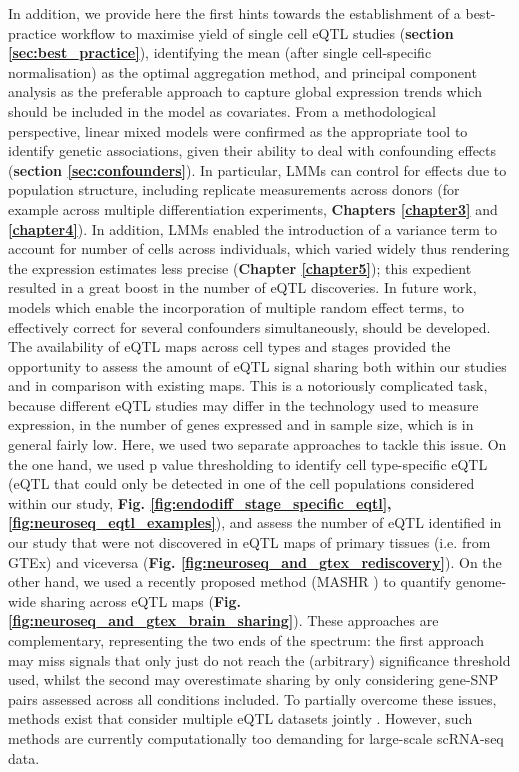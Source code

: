 In addition, we provide here the first hints towards the establishment of a best-practice workflow to maximise yield of single cell eQTL studies (\textbf{section \ref{sec:best_practice}}), identifying the mean (after single cell-specific normalisation) as the optimal aggregation method, and principal component analysis as the preferable approach to capture global expression trends which should be included in the model as covariates. 
From a methodological perspective, linear mixed models were confirmed as the appropriate tool to identify genetic associations, given their ability to deal with confounding effects (\textbf{section \ref{sec:confounders}}).
In particular, LMMs can control for effects due to population structure, including replicate measurements across donors (for example across multiple differentiation experiments, \textbf{Chapters \ref{chapter3}} and \textbf{\ref{chapter4}}).
In addition, LMMs enabled the introduction of a variance term to account for number of cells across individuals, which varied widely thus rendering the expression estimates less precise (\textbf{Chapter \ref{chapter5}}); this expedient resulted in a great boost in the number of eQTL discoveries. 
In future work, models which enable the incorporation of multiple random effect terms, to effectively correct for several confounders simultaneously, should be developed. 
\\

The availability of eQTL maps across cell types and stages provided the opportunity to assess the amount of eQTL signal sharing both within our studies and in comparison with existing maps.
This is a notoriously complicated task, because different eQTL studies may differ in the technology used to measure expression, in the number of genes expressed and in sample size, which is in general fairly low.
Here, we used two separate approaches to tackle this issue.
On the one hand, we used p value thresholding to identify cell type-specific eQTL (eQTL that could only be detected in one of the cell populations considered within our study, \textbf{Fig. \ref{fig:endodiff_stage_specific_eqtl}, \ref{fig:neuroseq_eqtl_examples}}), and assess the number of eQTL identified in our study that were not discovered in eQTL maps of primary tissues (i.e. from GTEx) and viceversa (\textbf{Fig. \ref{fig:neuroseq_and_gtex_rediscovery}}).
On the other hand, we used a recently proposed method (MASHR \cite{urbut2019flexible}) to quantify genome-wide sharing across eQTL maps (\textbf{Fig. \ref{fig:neuroseq_and_gtex_brain_sharing}}).
These approaches are complementary, representing the two ends of the spectrum: the first approach may miss signals that only just do not reach the (arbitrary) significance threshold used, whilst the second may overestimate sharing by only considering gene-SNP pairs assessed across all conditions included.
To partially overcome these issues, methods exist that consider multiple eQTL datasets jointly \cite{flutre2013statistical, sul2013effectively}. 
However, such methods are currently computationally too demanding for large-scale scRNA-seq data. \\

